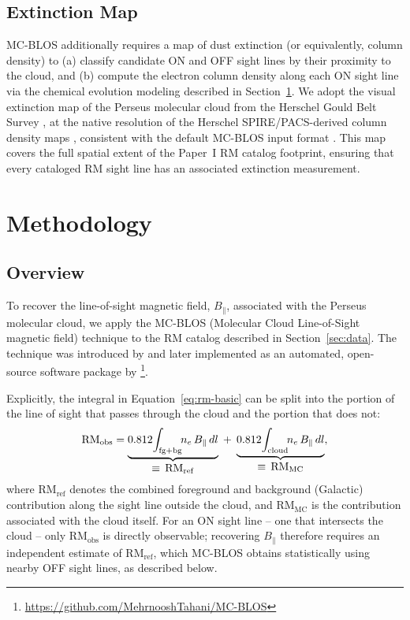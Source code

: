 \documentclass[twocolumn]{aastex631}
\begin{document}
\subsection{Extinction Map}

MC-BLOS additionally requires a map of dust extinction (or equivalently, column density) to (a) classify candidate ON and OFF sight lines by their proximity to the cloud, and (b) compute the electron column density along each ON sight line via the chemical evolution modeling described in Section~\ref{sec:method}. We adopt the visual extinction map of the Perseus molecular cloud from the Herschel Gould Belt Survey \citep[HGBS;][]{andre2010}, at the native resolution of the Herschel SPIRE/PACS-derived column density maps \citep[cf.][]{kainulainen2009}, consistent with the default MC-BLOS input format \citep{tahani2025mcblos}. This map covers the full spatial extent of the Paper~I RM catalog footprint, ensuring that every cataloged RM sight line has an associated extinction measurement.

\section{Methodology}
\label{sec:method}

\subsection{Overview}

To recover the line-of-sight magnetic field, $B_\parallel$, associated with the Perseus molecular cloud, we apply the MC-BLOS (Molecular Cloud Line-of-Sight magnetic field) technique to the RM catalog described in Section~\ref{sec:data}. The technique was introduced by \citet{tahani2018} and later implemented as an automated, open-source software package by \citet{tahani2025mcblos}\footnote{\url{https://github.com/MehrnooshTahani/MC-BLOS}}.

Explicitly, the integral in Equation~\ref{eq:rm-basic} can be split into the portion of the line of sight that passes through the cloud and the portion that does not:
\begin{equation}
\label{eq:rm-split}
    \mathrm{RM_{obs}} = \underbrace{0.812\!\int_{\rm fg+bg}\!\! n_e\, B_\parallel \, dl}_{\displaystyle \equiv\, \mathrm{RM_{ref}}} \;+\; \underbrace{0.812\!\int_{\rm cloud}\!\! n_e\, B_\parallel \, dl}_{\displaystyle \equiv\, \mathrm{RM_{MC}}},
\end{equation}
where $\mathrm{RM_{ref}}$ denotes the combined foreground and background (Galactic) contribution along the sight line outside the cloud, and $\mathrm{RM_{MC}}$ is the contribution associated with the cloud itself. For an ON sight line -- one that intersects the cloud -- only $\mathrm{RM_{obs}}$ is directly observable; recovering $B_\parallel$ therefore requires an independent estimate of $\mathrm{RM_{ref}}$, which MC-BLOS obtains statistically using nearby OFF sight lines, as described below.
\end{document}
